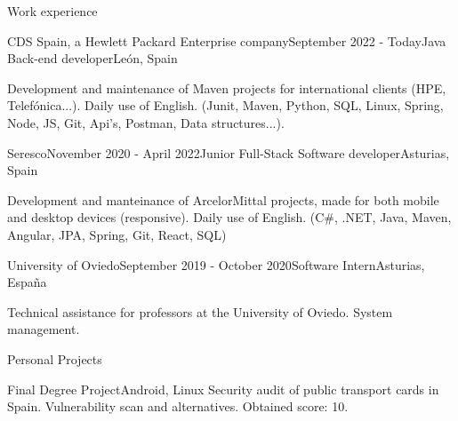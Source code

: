 \documentclass{resume} %
\begin{document}

\begin{rSection}{Work experience}

\begin{rSubsection}{CDS Spain, a Hewlett Packard Enterprise company}{September 2022 - Today}{Java Back-end developer}{León, Spain}
\item Development and maintenance of Maven projects for international clients (HPE, Telefónica...). Daily use of English. (Junit, Maven, Python, SQL, Linux, Spring, Node, JS, Git, Api's, Postman, Data structures...).
\end{rSubsection}

\begin{rSubsection}{Seresco}{November 2020 - April 2022}{Junior Full-Stack Software developer}{Asturias, Spain}
\item Development and manteinance of ArcelorMittal projects, made for both mobile and desktop devices (responsive). Daily use of English. (C\#, .NET, Java, Maven, Angular, JPA, Spring, Git, React, SQL)
\end{rSubsection}

\begin{rSubsection}{University of Oviedo}{September 2019 - October 2020}{Software Intern}{Asturias, España}
\item Technical assistance for professors at the University of Oviedo. System management.
\end{rSubsection}

\end{rSection}


\begin{rSection}{Personal Projects}
\begin{rSubsection}{{Final Degree Project}}{Android, Linux}{}{}
Security audit of public transport cards in Spain. Vulnerability scan and alternatives.
Obtained score: 10.
\end{rSubsection}
\end{rSection}


\end{document}
